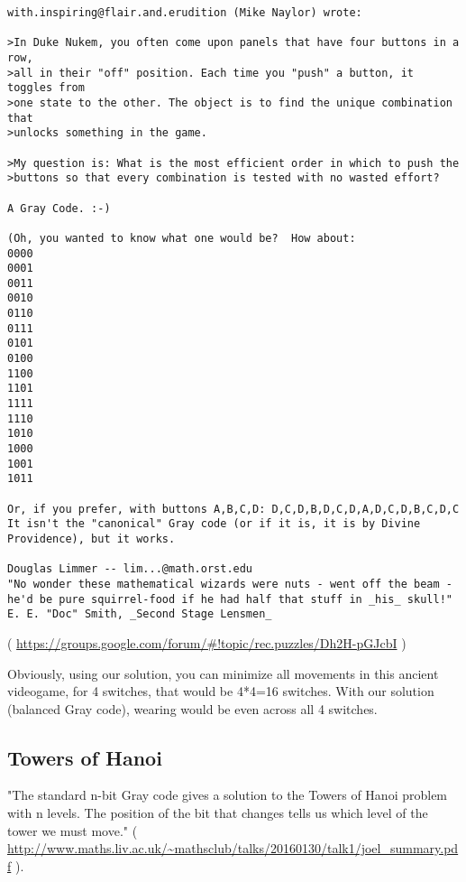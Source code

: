 \begin{lstlisting}
with.inspiring@flair.and.erudition (Mike Naylor) wrote:

>In Duke Nukem, you often come upon panels that have four buttons in a row,
>all in their "off" position. Each time you "push" a button, it toggles from
>one state to the other. The object is to find the unique combination that
>unlocks something in the game.

>My question is: What is the most efficient order in which to push the
>buttons so that every combination is tested with no wasted effort?

A Gray Code. :-)

(Oh, you wanted to know what one would be?  How about:
0000
0001
0011
0010
0110
0111
0101
0100
1100
1101
1111
1110
1010
1000
1001
1011

Or, if you prefer, with buttons A,B,C,D: D,C,D,B,D,C,D,A,D,C,D,B,C,D,C
It isn't the "canonical" Gray code (or if it is, it is by Divine
Providence), but it works.

Douglas Limmer -- lim...@math.orst.edu
"No wonder these mathematical wizards were nuts - went off the beam -
he'd be pure squirrel-food if he had half that stuff in _his_ skull!"
E. E. "Doc" Smith, _Second Stage Lensmen_
\end{lstlisting}

( \url{https://groups.google.com/forum/#!topic/rec.puzzles/Dh2H-pGJcbI} )

Obviously, using our solution, you can minimize all movements in this ancient videogame, for 4 switches, that would be 4*4=16 switches.
With our solution (balanced Gray code), wearing would be even across all 4 switches.

\subsection{Towers of Hanoi}

"The standard n-bit Gray code gives a solution to the Towers of Hanoi problem with n levels.
The position of the bit that changes tells us which level of the tower we must move."
( \url{http://www.maths.liv.ac.uk/~mathsclub/talks/20160130/talk1/joel_summary.pdf} ).

